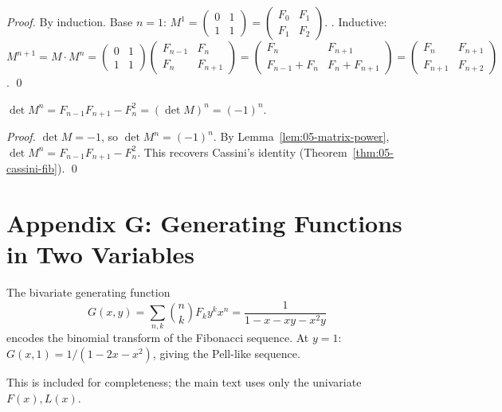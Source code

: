 \begin{proof}
By induction. Base $n = 1$: $M^1 = \begin{pmatrix} 0 & 1 \\ 1 & 1 \end{pmatrix} =
\begin{pmatrix} F_0 & F_1 \\ F_1 & F_2 \end{pmatrix}$. \checkmark.
Inductive: $M^{n+1} = M \cdot M^n = \begin{pmatrix} 0 & 1 \\ 1 & 1 \end{pmatrix}
\begin{pmatrix} F_{n-1} & F_n \\ F_n & F_{n+1} \end{pmatrix}
= \begin{pmatrix} F_n & F_{n+1} \\ F_{n-1} + F_n & F_n + F_{n+1} \end{pmatrix}
= \begin{pmatrix} F_n & F_{n+1} \\ F_{n+1} & F_{n+2} \end{pmatrix}$. \qed
\end{proof}

\begin{corollary}
\label{fa_05:cor:05-matrix-cassini}
$\det M^n = F_{n-1} F_{n+1} - F_n^2 = (\det M)^n = (-1)^n$.
\end{corollary}

\begin{proof}
$\det M = -1$, so $\det M^n = (-1)^n$. By Lemma~\ref{lem:05-matrix-power},
$\det M^n = F_{n-1} F_{n+1} - F_n^2$. This recovers Cassini's
identity (Theorem~\ref{thm:05-cassini-fib}). \qed
\end{proof}

\section*{Appendix G: Generating Functions in Two Variables}
\label{fa_05:sec:05-app-G}

The bivariate generating function
\[
  G(x, y) = \sum_{n, k} \binom{n}{k} F_k y^k x^n = \frac{1}{1 - x - x y - x^2 y}
\]
encodes the binomial transform of the Fibonacci sequence. At $y = 1$:
$G(x, 1) = 1/(1 - 2x - x^2)$, giving the Pell-like sequence.

This is included for completeness; the main text uses only the
univariate $F(x), L(x)$.


